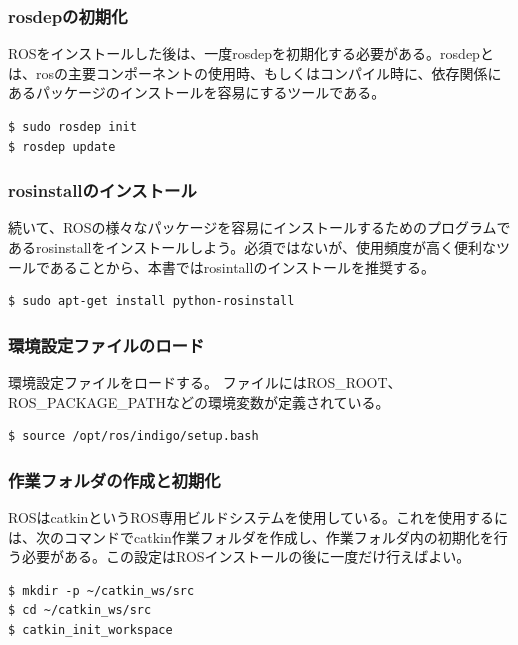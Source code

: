 \subsubsection{rosdepの初期化}
ROSをインストールした後は、一度rosdepを初期化する必要がある。rosdepとは、rosの主要コンポーネントの使用時、もしくはコンパイル時に、依存関係にあるパッケージのインストールを容易にするツールである。

\begin{lstlisting}[language=ROS]
$ sudo rosdep init
$ rosdep update
\end{lstlisting}

\subsubsection{rosinstallのインストール}
続いて、ROSの様々なパッケージを容易にインストールするためのプログラムであるrosinstallをインストールしよう。必須ではないが、使用頻度が高く便利なツールであることから、本書ではrosintallのインストールを推奨する。

\begin{lstlisting}[language=ROS]
$ sudo apt-get install python-rosinstall
\end{lstlisting}

\subsubsection{環境設定ファイルのロード}

環境設定ファイルをロードする。 ファイルにはROS\_ROOT、ROS\_PACKAGE\_PATHなどの環境変数が定義されている。

\begin{lstlisting}[language=ROS]
$ source /opt/ros/indigo/setup.bash
\end{lstlisting}

\subsubsection{作業フォルダの作成と初期化}

ROSはcatkinというROS専用ビルドシステムを使用している。これを使用するには、次のコマンドでcatkin作業フォルダを作成し、作業フォルダ内の初期化を行う必要がある。この設定はROSインストールの後に一度だけ行えばよい。

\begin{lstlisting}[language=ROS]
$ mkdir -p ~/catkin_ws/src
$ cd ~/catkin_ws/src
$ catkin_init_workspace
\end{lstlisting}

